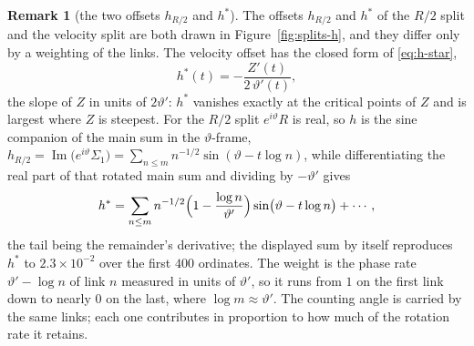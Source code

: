 \documentclass[11pt]{article}
\theoremstyle{definition}
\newtheorem{remark}[theorem]{Remark}
\begin{document}
\begin{remark}[the two offsets $h_{R/2}$ and $h^{\ast}$]\label{rem:taper}
The offsets $h_{R/2}$ and $h^{\ast}$ of the $R/2$ split and the velocity split
are both drawn in Figure~\ref{fig:splits-h}, and they differ only by a
weighting of the links. The velocity offset has the closed form of
\eqref{eq:h-star},
\begin{equation}\label{eq:h-star-slope}
h^{\ast}(t)=-\frac{Z'(t)}{2\,\vartheta'(t)},
\end{equation}
the slope of $Z$ in units of $2\vartheta'$: $h^{\ast}$ vanishes exactly at the
critical points of $Z$ and is largest where $Z$ is steepest. For the $R/2$ split
$e^{i\vartheta}R$ is real, so $h$ is the sine companion of the main sum in the
$\vartheta$-frame,
$h_{R/2}=\operatorname{Im}\bigl(e^{i\vartheta}\Sigma_1\bigr)
=\sum_{n\leq m}n^{-1/2}\sin(\vartheta-t\log n)$, while differentiating the real
part of that rotated main sum and dividing by $-\vartheta'$ gives
\[
h^{\ast}=\sum_{n\leq m}n^{-1/2}
\Bigl(1-\frac{\log n}{\vartheta'}\Bigr)\sin\bigl(\vartheta-t\log n\bigr)+\cdots,
\]
the tail being the remainder's derivative; the displayed sum by itself
reproduces $h^{\ast}$ to $2.3\times10^{-2}$ over the first $400$ ordinates.
The weight is the phase rate $\vartheta'-\log n$ of link $n$ measured in units of
$\vartheta'$, so it runs from $1$ on the first link down to nearly $0$ on the last,
where $\log m\approx\vartheta'$. The counting angle is carried by the same links;
each one contributes in proportion to how much of the rotation rate it retains.
\end{remark}
\end{document}
